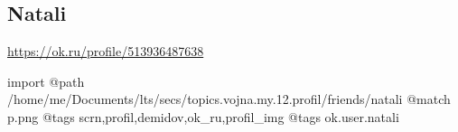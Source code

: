  
 
 
 
 

\subsection{Natali}

\url{https://ok.ru/profile/513936487638}

\ifcmt
 import
 @path /home/me/Documents/lts/secs/topics.vojna.my.12.profil/friends/natali
 @match p.png
 @tags scrn,profil,demidov,ok_ru,profil_img
 @tags ok.user.natali
\fi

